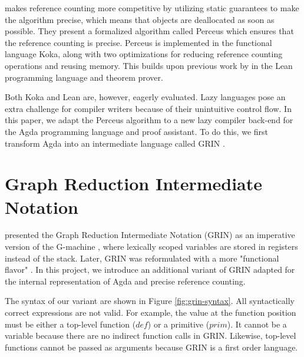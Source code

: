 \documentclass{article}
\begin{document}
\citet{reinking2021} makes reference counting more competitive by utilizing static guarantees to make the algorithm precise, which means that objects are deallocated as soon as possible.
They present a formalized algorithm called Perceus which ensures that the reference counting is precise. 
Perceus is implemented in the functional language Koka, along with two optimizations for reducing reference counting operations and reusing memory.
This builds upon previous work by \citet{ullrich2021} in the Lean programming language and theorem prover. 

Both Koka and Lean are, however, eagerly evaluated. 
Lazy languages pose an extra challenge for compiler writers because of their unintuitive control flow. 
In this paper, we adapt the Perceus algorithm to a new lazy compiler back-end for the Agda programming language and proof assistant.
To do this, we first transform Agda into an intermediate language called GRIN \citep{johnsson1991}.

\section{Graph Reduction Intermediate Notation}
\citet{johnsson1991} presented the Graph Reduction Intermediate Notation (GRIN) as an imperative version of the G-machine \citep{johnsson1984}, where lexically scoped variables are stored in registers instead of the stack. 
Later, GRIN was reformulated with a more "functional flavor" \citep{boquist1995}.
In this project, we introduce an additional variant of GRIN adapted for the internal representation of Agda and precise reference counting. 

The syntax of our variant are shown in Figure \ref{fig:grin-syntax}.
All syntactically correct expressions are not valid. For example, the value at the function 
position must be either a top-level function ($def$) or a primitive ($prim$). It cannot be a variable because
there are no indirect function calls in GRIN. Likewise, top-level functions cannot be passed 
as arguments because GRIN is a first order language.
\end{document}

